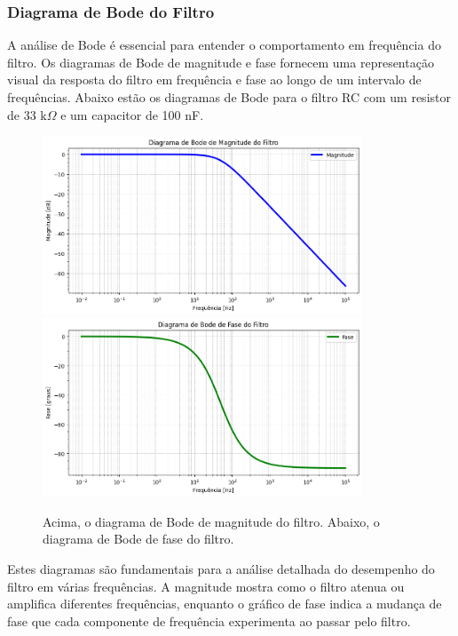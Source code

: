 \documentclass[
	12pt,				%
	openright,			%
	twoside,			%
	a4paper,			%
	english,			%
	french,				%
	spanish,			%
	brazil,				%
	]{abntex2}
\begin{document}
\subsubsection{Diagrama de Bode do Filtro}
A análise de Bode é essencial para entender o comportamento em frequência do filtro. Os diagramas de Bode de magnitude e fase fornecem uma representação visual da resposta do filtro em frequência e fase ao longo de um intervalo de frequências. Abaixo estão os diagramas de Bode para o filtro RC com um resistor de \(33 \text{ k}\Omega\) e um capacitor de 100 nF.

\begin{figure}[H]
    \centering
    \includegraphics[width=0.85\textwidth]{imgs/first_circuit_bode_magnitude.png}
    \hspace{0.05\textwidth} %
    \includegraphics[width=0.85\textwidth]{imgs/first_circuit_bode_phase.png}
    \caption{Acima, o diagrama de Bode de magnitude do filtro. Abaixo, o diagrama de Bode de fase do filtro.}
    \label{fig:first_circuit_bode_diagrams}
\end{figure}



Estes diagramas são fundamentais para a análise detalhada do desempenho do filtro em várias frequências. A magnitude mostra como o filtro atenua ou amplifica diferentes frequências, enquanto o gráfico de fase indica a mudança de fase que cada componente de frequência experimenta ao passar pelo filtro.
\end{document}
